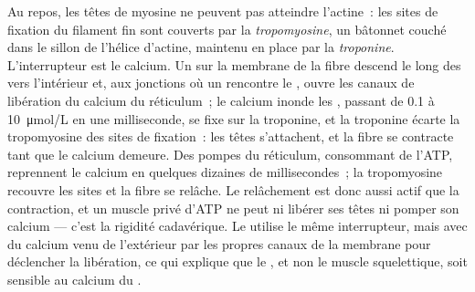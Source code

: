 \begin{proposition}\label{prop:b2:muscle-movement:coupling}
Au repos, les têtes de myosine ne peuvent pas atteindre l'actine~: les
sites de fixation du filament fin sont couverts par la
\emph{tropomyosine}, un bâtonnet couché dans le sillon de l'hélice
d'actine, maintenu en place par la \emph{troponine}.
L'interrupteur est le calcium. Un  sur la membrane de
la fibre descend le long des  vers l'intérieur et, aux jonctions
où un  rencontre le , ouvre les canaux de
libération du calcium du réticulum~; le calcium inonde les ,
passant de \qty{0.1}{} à \qty{10}{\micro mol/L} en une milliseconde, se
fixe sur la troponine, et la troponine écarte la tropomyosine des sites
de fixation~: les têtes s'attachent, et la fibre se contracte tant que le
calcium demeure. Des pompes du réticulum, consommant de l'ATP, reprennent
le calcium en quelques dizaines de millisecondes~; la tropomyosine
recouvre les sites et la fibre se relâche. Le relâchement est donc aussi
actif que la contraction, et un muscle privé d'ATP ne peut ni libérer ses
têtes ni pomper son calcium --- c'est la rigidité cadavérique. Le 
utilise le même interrupteur, mais avec du calcium venu de l'extérieur
par les propres canaux de la membrane pour déclencher la libération,
ce qui explique que le , et non le muscle squelettique, soit sensible
au calcium du .
\end{proposition}

